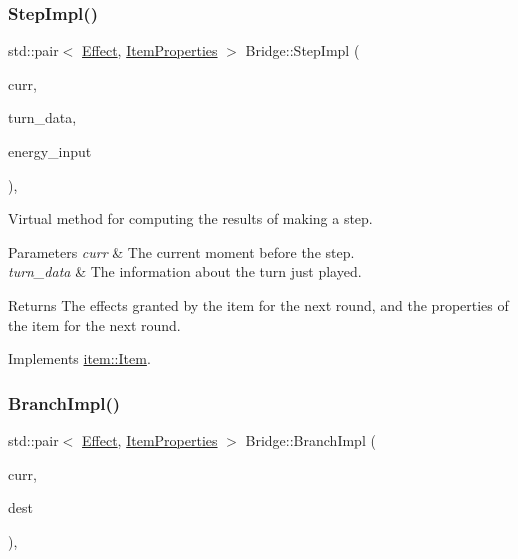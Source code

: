 \subsubsection{\texorpdfstring{Step\+Impl()}{StepImpl()}}
{\footnotesize\ttfamily std\+::pair$<$ \hyperlink{classitem_1_1_effect}{Effect}, \hyperlink{classitem_1_1_item_properties}{Item\+Properties} $>$ Bridge\+::\+Step\+Impl (\begin{DoxyParamCaption}\item[{\hyperlink{classtimeplane_1_1_moment}{Moment}}]{curr,  }\item[{\hyperlink{classroundinfo_1_1_round_info_view}{Round\+Info\+View} const \&}]{turn\+\_\+data,  }\item[{int}]{energy\+\_\+input }\end{DoxyParamCaption})\hspace{0.3cm}{\ttfamily [protected]}, {\ttfamily [virtual]}}



Virtual method for computing the results of making a step. 


\begin{DoxyParams}{Parameters}
{\em curr} & The current moment before the step. \\
\hline
{\em turn\+\_\+data} & The information about the turn just played. \\
\hline
\end{DoxyParams}
\begin{DoxyReturn}{Returns}
The effects granted by the item for the next round, and the properties of the item for the next round. 
\end{DoxyReturn}


Implements \hyperlink{classitem_1_1_item_a90df61c8a2a20144eb1100af5fb2d464}{item\+::\+Item}.

\mbox{\label{classitem_1_1_bridge_a175b2a911174c682ea163bc248836a87}} 
\subsubsection{\texorpdfstring{Branch\+Impl()}{BranchImpl()}}
{\footnotesize\ttfamily std\+::pair$<$ \hyperlink{classitem_1_1_effect}{Effect}, \hyperlink{classitem_1_1_item_properties}{Item\+Properties} $>$ Bridge\+::\+Branch\+Impl (\begin{DoxyParamCaption}\item[{\hyperlink{classtimeplane_1_1_moment}{Moment}}]{curr,  }\item[{\hyperlink{classtimeplane_1_1_moment}{Moment}}]{dest }\end{DoxyParamCaption})\hspace{0.3cm}{\ttfamily [protected]}, {\ttfamily [virtual]}}



